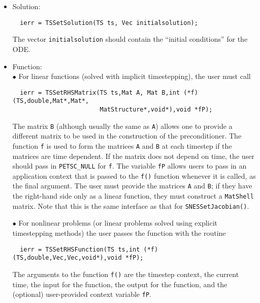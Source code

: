 \begin{itemize}
\item Solution:\\
\begin{verbatim}
  ierr = TSSetSolution(TS ts, Vec initialsolution);
\end{verbatim}
The vector {\tt initialsolution} should contain the ``initial conditions''
for the ODE. 

\item Function: \\
\subitem $ \bullet $ For linear functions (solved with implicit timestepping),
 the user must call 
\begin{verbatim}
  ierr = TSSetRHSMatrix(TS ts,Mat A, Mat B,int (*f)(TS,double,Mat*,Mat*,
                        MatStructure*,void*),void *fP);
\end{verbatim}
The matrix {\tt B} (although usually the same as {\tt A}) allows one to 
provide 
a different matrix to be used in the construction of the preconditioner.
The function {\tt f} is used to form the matrices {\tt A} and {\tt B} 
at each timestep if the matrices are time dependent.
If the matrix does not depend on time, the user should 
pass in {\tt PETSC\_NULL} for {\tt f}.  The variable {\tt fP} allows 
users to pass in an application context that is passed to the {\tt f()} function 
whenever it is called, as the final argument. The user must provide the matrices
{\tt A} and {\tt B}; if they have the right-hand side only as a linear
function, they must construct a {\tt MatShell} matrix. Note that this is 
the same interface as that for {\tt SNESSetJacobian()}. 

\subitem $ \bullet $  For nonlinear problems (or linear problems solved using
explicit timestepping methods) the user  passes the function with 
the routine

\begin{verbatim}
  ierr = TSSetRHSFunction(TS ts,int (*f)(TS,double,Vec,Vec,void*),void *fP);
\end{verbatim}
The  arguments to the function {\tt f()} are
the timestep context, the current time, the input for the function,
the output for the function, and the (optional) user-provided context
variable {\tt fP}.


\end{itemize}
